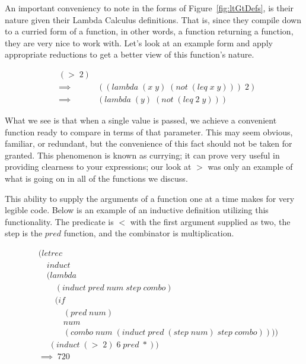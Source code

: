 An important conveniency to note in the forms of Figure~\ref{fig:ltGtDefs}, is
their nature given their Lambda Calculus definitions. That is, since they
compile down to a curried form of a function, in other words, a function
returning a function, they are very nice to work with. Let's look at an example
form and apply appropriate reductions to get a better view of this function's
nature.

\begin{figure}[htp]
\caption{}\label{fig:gtNature}
\begin{align*}
& (> \; 2)
\\& \implies \; &((lambda \; (x \; y) \; (not \; (leq \; x \; y))) \; 2)
\\& \implies \; &(lambda \; (y) \; (not \; (leq \; 2 \; y))) \; 
\end{align*}
\end{figure}

What we see is that when a single value is passed, we achieve a convenient 
function ready to compare in terms of that parameter. This may seem obvious, 
familiar, or redundant, but the convenience of this fact should not be taken for 
granted. This phenomenon is known as currying; it can prove very useful in 
providing clearness to your expressions; our look at $>$ was only an example of 
what is going on in all of the functions we discuss.

This ability to supply the arguments of a function one at a time makes for very 
legible code. Below is an example of an inductive definition utilizing this 
functionality. The predicate is $<$ with the first argument supplied as two, the 
step is the $pred$ function, and the combinator is multiplication.

\begin{figure}[htp]
\caption{}\label{fig:inductiveCalculator}
\begin{align*}
& (letrec \; 
\\& \quad induct \; 
\\& \quad (lambda \; 
\\& \qquad (induct \; pred \; num \; step \; combo) \; 
\\& \qquad (if \; 
\\& \qquad \quad (pred \; num) \; 
\\& \qquad \quad num \; 
\\& \qquad \quad (combo \; num \; (induct \; pred \; (step \; num) \; step \; combo)))) \; 
\\& \quad \; (induct \; (> \; 2) \; 6 \; pred \; *))
\\& \implies \; 720
\end{align*}
\end{figure}

